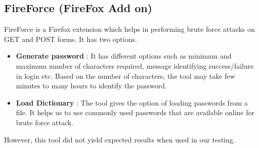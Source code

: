 \subsection{FireForce (FireFox Add on)}
FireForce is a Firefox extension which helps in performing brute force attacks on GET and POST forms. It has two options.
\begin{itemize}
    \item \textbf{Generate password} : It has different options such as minimum and maximum number of characters required, message identifying success/failure in login etc. Based on the number of characters, the tool may take few minutes to many hours to identify the password.
    \item \textbf{Load Dictionary} : The tool gives the option of loading passwords from a file. It helps us to use commonly used passwords that are available online for brute force attack.
\end{itemize}
However, this tool did not yield expected results when used in our testing.



